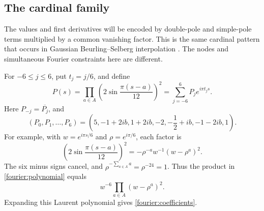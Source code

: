 \subsection{The cardinal family}

The values and first derivatives will be encoded by double-pole and
simple-pole terms multiplied by a common vanishing factor. This is the
same cardinal pattern that occurs in Gaussian Beurling--Selberg
interpolation \cite[formulas~(1.2)--(1.3)]{CarneiroLittmannVaaler2013}.
The nodes and simultaneous Fourier constraints here are different.

For \(-6\le j\le6\), put \(t_j=j/6\), and define
\begin{equation}\label{fourier:polynomial}
 P(s)=\prod_{a\in A}\left(2\sin\frac{\pi(s-a)}{12}\right)^2
     =\sum_{j=-6}^{6}P_j e^{i\pi t_js}.
\end{equation}
Here \(P_{-j}=\overline{P_j}\), and
\begin{equation}\label{fourier:coefficients}
 (P_0,P_1,\ldots,P_6)
 =\left(5,-1+2ib,1+2ib,-2,-\frac12+ib,-1-2ib,1\right).
\end{equation}
For example, with \(w=e^{i\pi s/6}\) and \(\rho=e^{i\pi/6}\), each factor is
\[
 \left(2\sin\frac{\pi(s-a)}{12}\right)^2
 =-\rho^{-a}w^{-1}(w-\rho^a)^2.
\]
The six minus signs cancel, and \(\rho^{-\sum_{a\in A}a}=\rho^{-24}=1\).
Thus the product in \eqref{fourier:polynomial} equals
\[
 w^{-6}\prod_{a\in A}(w-\rho^a)^2.
\]
Expanding this Laurent polynomial gives
\eqref{fourier:coefficients}.

